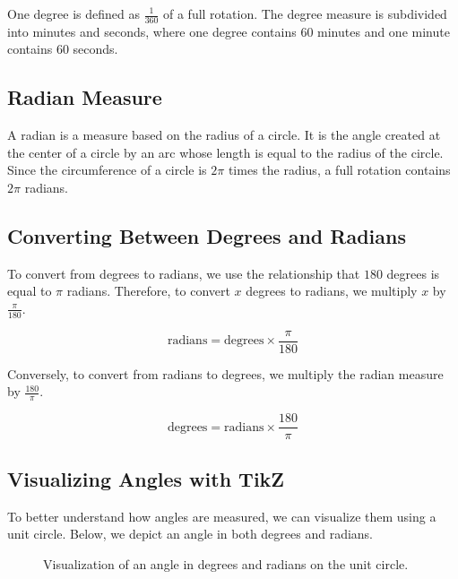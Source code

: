 \documentclass[a4paper,12pt]{book}
\begin{document}
One degree is defined as \(\frac{1}{360}\) of a full rotation. The degree measure is subdivided into minutes and seconds, where one degree contains \(60\) minutes and one minute contains \(60\) seconds.

\subsection{Radian Measure}
\label{subsec:radian_measure}

A radian is a measure based on the radius of a circle. It is the angle created at the center of a circle by an arc whose length is equal to the radius of the circle. Since the circumference of a circle is \(2\pi\) times the radius, a full rotation contains \(2\pi\) radians.

\subsection{Converting Between Degrees and Radians}
\label{subsec:converting_degrees_radians}

To convert from degrees to radians, we use the relationship that \(180\) degrees is equal to \(\pi\) radians. Therefore, to convert \(x\) degrees to radians, we multiply \(x\) by \(\frac{\pi}{180}\).

\[
\text{radians} = \text{degrees} \times \frac{\pi}{180}
\]

Conversely, to convert from radians to degrees, we multiply the radian measure by \(\frac{180}{\pi}\).

\[
\text{degrees} = \text{radians} \times \frac{180}{\pi}
\]

\subsection{Visualizing Angles with TikZ}
\label{subsec:visualizing_angles}

To better understand how angles are measured, we can visualize them using a unit circle. Below, we depict an angle in both degrees and radians.

\begin{figure}[ht!]
\centering
{}
\caption{Visualization of an angle in degrees and radians on the unit circle.}
\label{fig:angles_visualization}
\end{figure}
\end{document}
